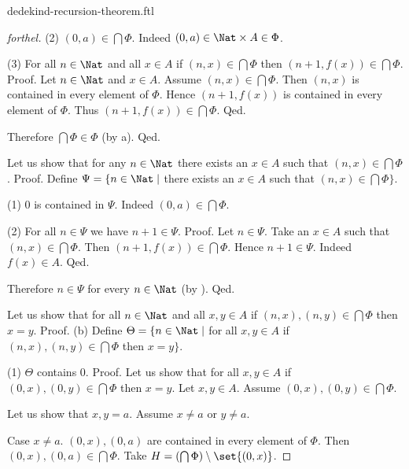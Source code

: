 \documentclass{naproche-library}
\begin{document}
\begin{smodule}[title=Dedekind's Recursion Theorem]{dedekind-recursion-theorem.ftl}
\begin{proof}[forthel]
    (2) $(0, a) \in \bigcap \Phi$. \newline
    Indeed $(0, a) \in \Nat \times A \in \Phi$.

    (3) For all $n \in \Nat$ and all $x \in A$ if $(n, x) \in
    \bigcap \Phi$ then $(n + 1, f(x)) \in \bigcap \Phi$. \newline
    Proof.
      Let $n \in \Nat$ and $x \in A$.
      Assume $(n, x) \in \bigcap \Phi$.
      Then $(n, x)$ is contained in every element of $\Phi$.
      Hence $(n + 1, f(x))$ is contained in every element of $\Phi$.
      Thus $(n + 1, f(x)) \in \bigcap \Phi$.
    Qed.

    Therefore $\bigcap \Phi \in \Phi$ (by a).
  Qed.

  Let us show that for any $n \in \Nat$ there exists an $x \in A$ such
  that $(n, x) \in \bigcap \Phi$. \newline
  Proof.
    Define $\Psi = \{ n \in \Nat \mid$ there exists an $x \in A$ such that
    $(n, x) \in \bigcap \Phi \}$.

    (1) $0$ is contained in $\Psi$.
    Indeed $(0, a) \in \bigcap \Phi$.

    (2) For all $n \in \Psi$ we have $n + 1 \in \Psi$. \newline
    Proof.
      Let $n \in \Psi$.
      Take an $x \in A$ such that $(n, x) \in \bigcap \Phi$.
      Then $(n + 1, f(x)) \in \bigcap \Phi$.
      Hence $n + 1 \in \Psi$.
      Indeed $f(x) \in A$.
    Qed.

    Therefore $n \in \Psi$ for every $n \in \Nat$ (by ).
  Qed.

  Let us show that for all $n \in \Nat$ and all $x, y \in A$ if
  $(n, x), (n, y) \in \bigcap \Phi$ then $x = y$. \newline
  Proof.
    (b) Define $\Theta = \{ n \in \Nat \mid$ for all $x, y \in A$ if
    $(n, x), (n, y) \in \bigcap \Phi$ then $x = y \}$.

    (1) $\Theta$ contains $0$. \newline
    Proof.
      Let us show that for all $x, y \in A$ if $(0, x), (0, y) \in
      \bigcap \Phi$ then $x = y$.
        Let $x, y \in A$.
        Assume $(0, x), (0, y) \in \bigcap \Phi$.

        Let us show that $x, y = a$.
          Assume $x \neq a$ or $y \neq a$.

          Case $x \neq a$.
            $(0,x), (0,a)$ are contained in every element of $\Phi$.
            Then $(0,x), (0,a) \in \bigcap \Phi$.
            Take $H = (\bigcap \Phi) \setminus \set{(0,x)}$.


\end{proof}
\end{smodule}
\end{document}
